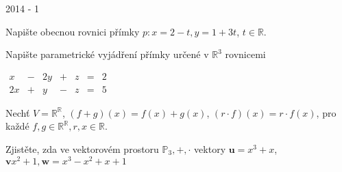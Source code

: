 
{\large 2014 - 1}

\begin{questions}

\question Napište obecnou rovnici přímky \(p: x=2-t, y=1+3t\), \(t \in \mathbb{R}\).

\question Napište parametrické vyjádření přímky určené v \(\mathbb{R}^3\) rovnicemi

\begin{center}
    \(\begin{matrix}
        x  & - & 2y & + & z & = & 2\\
        2x & + & y  & - & z & = & 5
    \end{matrix}\)
\end{center}

\newpage

\question Nechť \(V = \mathbb{R}^\mathbb{R}\), \((f+g)(x) = f(x)+g(x)\), \((r \cdot f)(x)=r \cdot f(x)\), pro každé \(f, g \in \mathbb{R}^\mathbb{R}, r, x \in \mathbb{R}\).


\question Zjistěte, zda ve vektorovém prostoru \(\mathbb{P}_3, +, \cdot\) vektory \(\textbf{u} = x^3+x\), \(\textbf{v} x^2+1, \textbf{w} = x^3-x^2+x+1\)



\end{questions}

